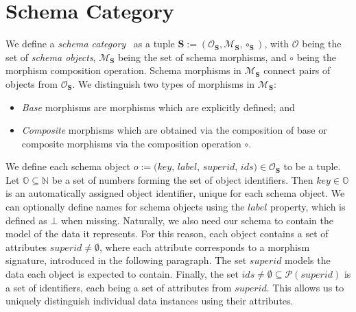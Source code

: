\section{Schema Category}
\label{categorical:section:schema}

We define a \textit{schema category}~\cite{one_model}\cite{unified_representation} as a tuple  $\mathbf{S} := (\mathcal{O}_\mathbf{S}, \mathcal{M}_\mathbf{S}, \circ_\mathbf{S})$, with $\mathcal{O}$ being the set of \textit{schema objects}, $\mathcal{M_\mathbf{S}}$ being the set of schema morphisms, and $\circ$ being the morphism composition operation.
Schema morphisms in $\mathcal{M}_\mathbf{S}$ connect pairs of objects from $\mathcal{O_\mathbf{S}}$.
We distinguish two types of morphisms in $\mathcal{M}_\mathbf{S}$:

\begin{itemize}
    \item \textit{Base} morphisms are morphisms which are explicitly defined; and
    \item \textit{Composite} morphisms which are obtained via the composition of base or composite morphisms via the composition operation $\circ$.
\end{itemize}

We define each schema object $o := (key$, $label$, $superid$, $ids) \in \mathcal{O}_\mathbf{S}$ to be a tuple.
Let $\mathbb{O} \subseteq \mathbb{N}$ be a set of numbers forming the set of object identifiers.
Then $key \in \mathbb{O}$ is an automatically assigned object identifier, unique for each schema object.
We can optionally define names for schema objects using the $label$ property, which is defined as $\bot$ when missing.
Naturally, we also need our schema to contain the model of the data it represents.
For this reason, each object contains a set of attributes $superid \ne \emptyset$, where each attribute corresponds to a morphism signature, introduced in the following paragraph.
The set $superid$ models the data each object is expected to contain.
Finally, the set $ids \ne \emptyset \subseteq \mathcal{P}(superid)$ is a set of identifiers, each being a set of attributes from $superid$.
This allows us to uniquely distinguish individual data instances using their attributes.

\def\myConcat{\!\cdot\!}

